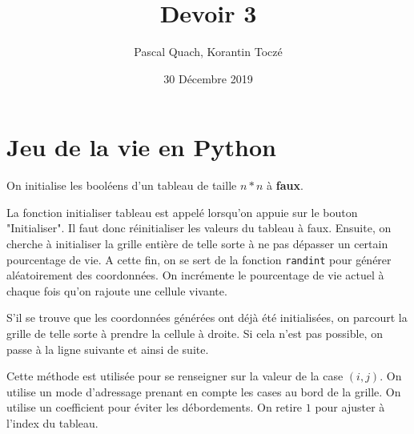 \documentclass[
	12pt, %
]{fphw}
\title{Devoir 3} %
\author{Pascal Quach, Korantin Toczé} %
\institute{Université de Technologie de Compiègne} %
\date{30 Décembre 2019} %
\begin{document}
\maketitle %

\section*{Jeu de la vie en Python}

\begin{problem}
	
\end{problem}
On initialise les booléens d'un tableau de taille $n*n$ à \textbf{faux}. 


\begin{problem}
	
\end{problem}
La fonction initialiser tableau est appelé lorsqu'on appuie sur le bouton "Initialiser". Il faut donc réinitialiser les valeurs du tableau à faux. Ensuite, on cherche à initialiser la grille entière de telle sorte à ne pas dépasser un certain pourcentage de vie. A cette fin, on se sert de la fonction \texttt{randint} pour générer aléatoirement des coordonnées. On incrémente le pourcentage de vie actuel à chaque fois qu'on rajoute une cellule vivante. 

S'il se trouve que les coordonnées générées ont déjà été initialisées, on parcourt la grille de telle sorte à prendre la cellule à droite. Si cela n'est pas possible, on passe à la ligne suivante et ainsi de suite. 


\begin{problem}
	
\end{problem}
Cette méthode est utilisée pour se renseigner sur la valeur de la case $(i,j)$. On utilise un mode d'adressage prenant en compte les cases au bord de la grille. On utilise un coefficient pour éviter les débordements. On retire $1$ pour ajuster à l'index du tableau. 
\end{document}
